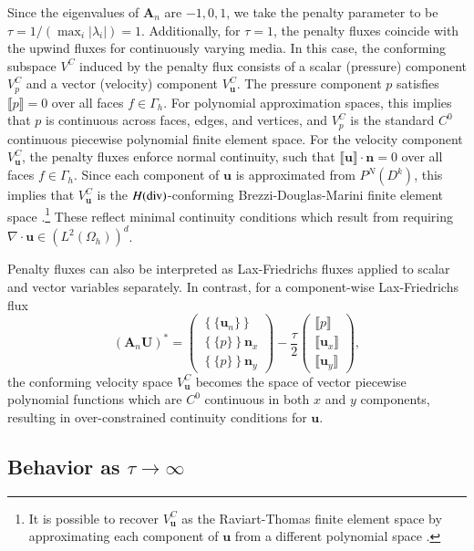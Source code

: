 \documentclass[preprint,10pt]{elsarticle}
\newcommand{\LRp}[1]{\left( #1 \right)}
\newcommand{\LRc}[1]{\left\{ #1 \right\}}
\newcommand{\Div} {\ensuremath{\nabla\cdot}}
\newcommand{\jump}[1] {\ensuremath{\llbracket#1\rrbracket}}
\newcommand{\avg}[1] {\ensuremath{\LRc{\!\{#1\}\!}}}
\newcommand{\Gh}{\Gamma_h}
\newcommand{\Oh}{\Omega_h}
\begin{document}
Since the eigenvalues of $\bm{A}_n$ are $-1,0,1$, we take the penalty parameter to be $\tau = 1 / (\max_i |\lambda_i|) = 1$.   Additionally, for $\tau = 1$, the penalty fluxes coincide with the upwind fluxes for continuously varying media.  In this case, the conforming subspace $V^{C}$ induced by the penalty flux consists of a scalar (pressure) component $V^C_p$ and a vector (velocity) component $V^C_{\bm{u}}$.  The pressure component $p$ satisfies $\jump{p} = 0$ over all faces $f\in \Gh$.  For polynomial approximation spaces, this implies that $p$ is continuous across faces, edges, and vertices, and $V^C_p$ is the standard $C^0$ continuous piecewise polynomial finite element space.  For the velocity component $V_{\bm{u}}^C$, the penalty fluxes enforce normal continuity, such that $\jump{\bm{u}}\cdot \bm{n} = 0$ over all faces $f \in \Gh$.  Since each component of $\bm{u}$ is approximated from $P^N(D^k)$, this implies that $V^C_{\bm{u}}$ is the $H({\rm div})$-conforming Brezzi-Douglas-Marini finite element space \cite{brezzi1985two,boffi2013mixed}.\footnote{It is possible to recover $V^C_{\bm{u}}$ as the Raviart-Thomas finite element space by approximating each component of $\bm{u}$ from a different polynomial space \cite{kirby2004algorithm}.}   These reflect minimal continuity conditions which result from requiring $\Div \bm{u} \in \LRp{L^2\LRp{\Oh}}^d$.

Penalty fluxes can also be interpreted as Lax-Friedrichs fluxes applied to scalar and vector variables separately.  In contrast, for a component-wise Lax-Friedrichs flux 
\[
(\bm{A}_n\bm{U})^* = \left(\begin{array}{c}
\avg{\bm{u}_n}\\
\avg{p }\bm{n}_x\\
\avg{p }\bm{n}_y
\end{array}
\right) - 
\frac{\tau}{2}\left(\begin{array}{c}
\jump{p}\\
\jump{\bm{u}_x}\\
\jump{\bm{u}_y}
\end{array}
\right),
\]
the conforming velocity space $V^C_{\bm{u}}$ becomes the space of vector piecewise polynomial functions which are $C^0$ continuous in both $x$ and $y$ components, resulting in over-constrained continuity conditions for $\bm{u}$.

\subsection{Behavior as $\tau\rightarrow\infty$}
\end{document}

